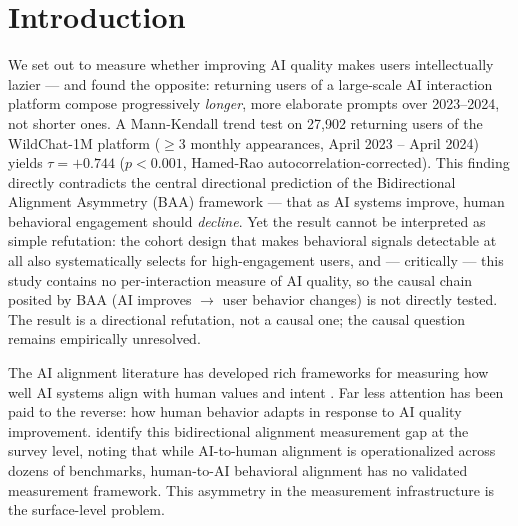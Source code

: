 \section{Introduction}

We set out to measure whether improving AI quality makes users intellectually lazier --- and found the opposite: returning users of a large-scale AI interaction platform compose progressively \emph{longer}, more elaborate prompts over 2023--2024, not shorter ones. A Mann-Kendall trend test on 27,902 returning users of the WildChat-1M platform ($\geq$3 monthly appearances, April 2023 -- April 2024) yields $\tau = +0.744$ ($p < 0.001$, Hamed-Rao autocorrelation-corrected). This finding directly contradicts the central directional prediction of the Bidirectional Alignment Asymmetry (BAA) framework --- that as AI systems improve, human behavioral engagement should \emph{decline}. Yet the result cannot be interpreted as simple refutation: the cohort design that makes behavioral signals detectable at all also systematically selects for high-engagement users, and --- critically --- this study contains no per-interaction measure of AI quality, so the causal chain posited by BAA (AI improves $\rightarrow$ user behavior changes) is not directly tested. The result is a directional refutation, not a causal one; the causal question remains empirically unresolved.

The AI alignment literature has developed rich frameworks for measuring how well AI systems align with human values and intent \citep{Ouyang2022Training, Liang2022Holistic, Bai2022Training}. Far less attention has been paid to the reverse: how human behavior adapts in response to AI quality improvement. \citet{Shen2024Towards} identify this bidirectional alignment measurement gap at the survey level, noting that while AI-to-human alignment is operationalized across dozens of benchmarks, human-to-AI behavioral alignment has no validated measurement framework. This asymmetry in the measurement infrastructure is the surface-level problem.

